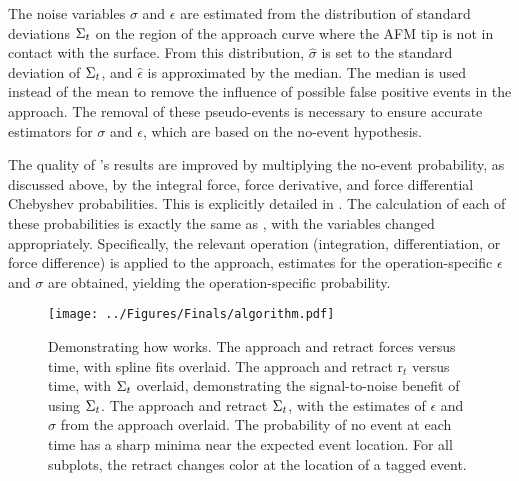 The noise variables $\sigma$ and $\epsilon$ are estimated from the distribution of standard deviations $\Sigma_t$ on the region of the approach curve where the AFM tip is not in contact with the surface. From this distribution, $\hat{\sigma}$ is set to the standard deviation of $\Sigma_t$, and $\hat{\epsilon}$ is approximated by the median. The median is used instead of the mean to remove the influence of possible false positive events in the approach. The removal of these pseudo-events is necessary to ensure accurate estimators for $\sigma$ and $\epsilon$, which are based on the no-event hypothesis. 

The quality of \name{}'s results are improved by multiplying the no-event probability, as discussed above, by the integral force, force derivative, and force differential Chebyshev probabilities. This is explicitly detailed in . The calculation of each of these probabilities is exactly the same as , with the variables changed appropriately. Specifically, the relevant operation (integration, differentiation, or force difference) is applied to the approach, estimates for the operation-specific $\epsilon$ and $\sigma$ are obtained, yielding the operation-specific probability.


\begin{figure}[htp]
\caption[\name{} algorithmic pipeline]{\noindent{} Demonstrating how \name{} works.  The approach and retract forces versus time, with spline fits overlaid.  The approach and retract r$_t$ versus time, with $\Sigma_t$ overlaid, demonstrating the signal-to-noise benefit of using $\Sigma_t$.  The approach and retract $\Sigma_t$, with the estimates of $\epsilon$ and $\sigma$ from the approach overlaid.  The probability of no event at each time has a sharp minima near the expected event location. For all subplots, the retract changes color at the location of a tagged event.  }
\centering
\texttt{[image: ../Figures/Finals/algorithm.pdf]}%
\end{figure}

